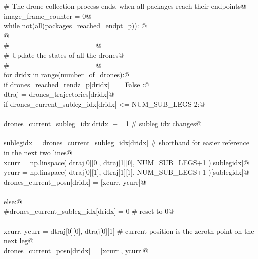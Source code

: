 \documentclass[10.0pt]{report}
\begin{document}
\begin{appendices}
\begin{flushleft}
\begin{list}{}{}
\mbox{}\verb@    # The drone collection process ends, when all packages reach their endpoints@\\
\mbox{}\verb@    image_frame_counter = 0@\\
\mbox{}\verb@    while not(all(packages_reached_endpt_p)): @\\
\mbox{}\verb@    @\\
\mbox{}\verb@        #-------------------------------------@\\
\mbox{}\verb@        # Update the states of all the drones@\\
\mbox{}\verb@        #-------------------------------------@\\
\mbox{}\verb@        for dridx in range(number_of_drones):@\\
\mbox{}\verb@             if drones_reached_rendz_p[dridx] == False :@\\
\mbox{}\verb@                  dtraj = drones_trajectories[dridx]@\\
\mbox{}\verb@                  if drones_current_subleg_idx[dridx] <= NUM_SUB_LEGS-2:@\\
\mbox{}\verb@@\\
\mbox{}\verb@                    drones_current_subleg_idx[dridx] += 1     # subleg idx changes@\\
\mbox{}\verb@@\\
\mbox{}\verb@                    sublegidx = drones_current_subleg_idx[dridx] # shorthand for easier reference in the next two lines@\\
\mbox{}\verb@                    xcurr = np.linspace( dtraj[0][0], dtraj[1][0], NUM_SUB_LEGS+1 )[sublegidx]@\\
\mbox{}\verb@                    ycurr = np.linspace( dtraj[0][1], dtraj[1][1], NUM_SUB_LEGS+1 )[sublegidx]@\\
\mbox{}\verb@                    drones_current_posn[dridx]  = [xcurr, ycurr]@\\
\mbox{}\verb@@\\
\mbox{}\verb@                  else:@\\
\mbox{}\verb@                    #drones_current_subleg_idx[dridx] = 0 # reset to 0@\\
\mbox{}\verb@@\\
\mbox{}\verb@                    xcurr, ycurr = dtraj[0][0], dtraj[0][1] # current position is the zeroth point on the next leg@\\
\mbox{}\verb@                    drones_current_posn[dridx]  = [xcurr , ycurr]@\\

\end{list}
\end{flushleft}
\end{appendices}
\end{document}
